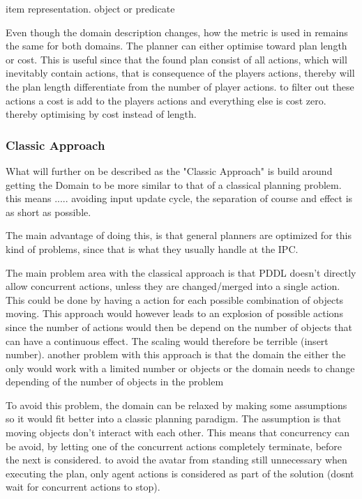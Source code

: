 		item representation. object or predicate

		
		Even though the domain description changes, how the metric is used in remains the same for both domains. The planner can either optimise toward plan length or cost. This is useful since that the found plan consist of all actions, which will inevitably contain actions, that is consequence of the players actions, thereby will the plan length differentiate from the number of player actions. to filter out these actions a cost is add to the players actions and everything else is cost zero. thereby optimising by cost instead of length.
	
		
		\subsubsection{Classic Approach}
		What will further on be described as the "Classic Approach" is build around getting the Domain to be more similar to that of a classical planning problem. 
		this means ..... avoiding input update cycle, the separation of course and effect is as short as possible.
		
		
		The main advantage of doing this, is that general planners are optimized for this kind of problems, since that is what they usually handle at the IPC.
		
		The main problem area with the classical approach is that PDDL doesn't directly allow concurrent actions, unless they are changed/merged into a single action. This could be done by having a action for each possible combination of objects moving. This approach would however leads to an explosion of possible actions since the number of actions would then be depend on the number of objects that can have a continuous effect. The scaling would therefore be terrible (insert number). another problem with this approach is that the domain the either the only would work with a limited number or objects or the domain needs to change depending of the number of objects in the problem
		
		
		To avoid this problem, the domain can be relaxed by making some assumptions so it would fit better into a classic planning paradigm. The assumption is that moving objects don't interact with each other. This means that concurrency can be avoid, by letting one of the concurrent actions completely terminate, before the next is considered. to avoid the avatar from standing still unnecessary when executing the plan, only agent actions is considered as part of the solution (dosnt wait for concurrent actions to stop).
		
